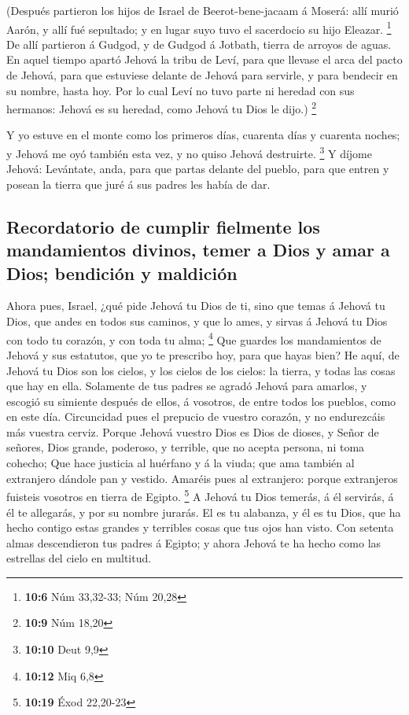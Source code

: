  (Después partieron los hijos de Israel de
Beerot-bene-jacaam á Moserá: allí murió Aarón, y allí fué sepultado; y
en lugar suyo tuvo el sacerdocio su hijo Eleazar. \footnote{\textbf{10:6}
  Núm 33,32-33; Núm 20,28}  De allí partieron á Gudgod, y
de Gudgod á Jotbath, tierra de arroyos de aguas.  En aquel
tiempo apartó Jehová la tribu de Leví, para que llevase el arca del
pacto de Jehová, para que estuviese delante de Jehová para servirle, y
para bendecir en su nombre, hasta hoy.  Por lo cual Leví
no tuvo parte ni heredad con sus hermanos: Jehová es su heredad, como
Jehová tu Dios le dijo.) \footnote{\textbf{10:9} Núm 18,20}

 Y yo estuve en el monte como los primeros días, cuarenta
días y cuarenta noches; y Jehová me oyó también esta vez, y no quiso
Jehová destruirte. \footnote{\textbf{10:10} Deut 9,9}  Y
díjome Jehová: Levántate, anda, para que partas delante del pueblo, para
que entren y posean la tierra que juré á sus padres les había de dar.

\hypertarget{recordatorio-de-cumplir-fielmente-los-mandamientos-divinos-temer-a-dios-y-amar-a-dios-bendiciuxf3n-y-maldiciuxf3n}{%
\subsection{Recordatorio de cumplir fielmente los mandamientos divinos,
temer a Dios y amar a Dios; bendición y
maldición}\label{recordatorio-de-cumplir-fielmente-los-mandamientos-divinos-temer-a-dios-y-amar-a-dios-bendiciuxf3n-y-maldiciuxf3n}}

 Ahora pues, Israel, ¿qué pide Jehová tu Dios de ti, sino
que temas á Jehová tu Dios, que andes en todos sus caminos, y que lo
ames, y sirvas á Jehová tu Dios con todo tu corazón, y con toda tu alma;
\footnote{\textbf{10:12} Miq 6,8}  Que guardes los
mandamientos de Jehová y sus estatutos, que yo te prescribo hoy, para
que hayas bien?  He aquí, de Jehová tu Dios son los
cielos, y los cielos de los cielos: la tierra, y todas las cosas que hay
en ella.  Solamente de tus padres se agradó Jehová para
amarlos, y escogió su simiente después de ellos, á vosotros, de entre
todos los pueblos, como en este día.  Circuncidad pues el
prepucio de vuestro corazón, y no endurezcáis más vuestra cerviz.
 Porque Jehová vuestro Dios es Dios de dioses, y Señor de
señores, Dios grande, poderoso, y terrible, que no acepta persona, ni
toma cohecho;  Que hace justicia al huérfano y á la
viuda; que ama también al extranjero dándole pan y vestido.
 Amaréis pues al extranjero: porque extranjeros fuisteis
vosotros en tierra de Egipto. \footnote{\textbf{10:19} Éxod 22,20-23}
 A Jehová tu Dios temerás, á él servirás, á él te
allegarás, y por su nombre jurarás.  El es tu alabanza, y
él es tu Dios, que ha hecho contigo estas grandes y terribles cosas que
tus ojos han visto.  Con setenta almas descendieron tus
padres á Egipto; y ahora Jehová te ha hecho como las estrellas del cielo
en multitud.

